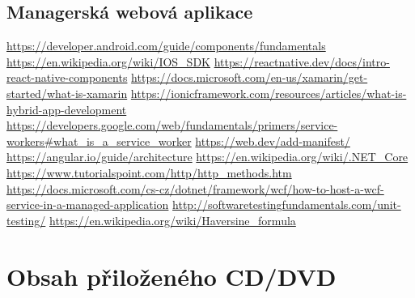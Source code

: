 \documentclass[
  biblatex,
  glossaries,
  index
]{kidiplom}
\begin{document}
\subsection{Managerská webová aplikace}

\newpage



\begin{thebibliography}{9}
     \url{https://developer.android.com/guide/components/fundamentals}
     \url{https://en.wikipedia.org/wiki/IOS\_SDK}
     \url{https://reactnative.dev/docs/intro-react-native-components}
     \url{https://docs.microsoft.com/en-us/xamarin/get-started/what-is-xamarin}
     \url{https://ionicframework.com/resources/articles/what-is-hybrid-app-development}
     \url{https://developers.google.com/web/fundamentals/primers/service-workers\#what\_is\_a\_service\_worker}
     \url{https://web.dev/add-manifest/}
     \url{https://angular.io/guide/architecture}
     \url{https://en.wikipedia.org/wiki/.NET\_Core}
     \url{https://www.tutorialspoint.com/http/http\_methods.htm}
     \url{https://docs.microsoft.com/cs-cz/dotnet/framework/wcf/how-to-host-a-wcf-service-in-a-managed-application}
     \url{http://softwaretestingfundamentals.com/unit-testing/}
     \url{https://en.wikipedia.org/wiki/Haversine\_formula}
\end{thebibliography}


\newpage
\section{Obsah přiloženého CD/DVD} \label{sec:ObsahCD}
\end{document}
